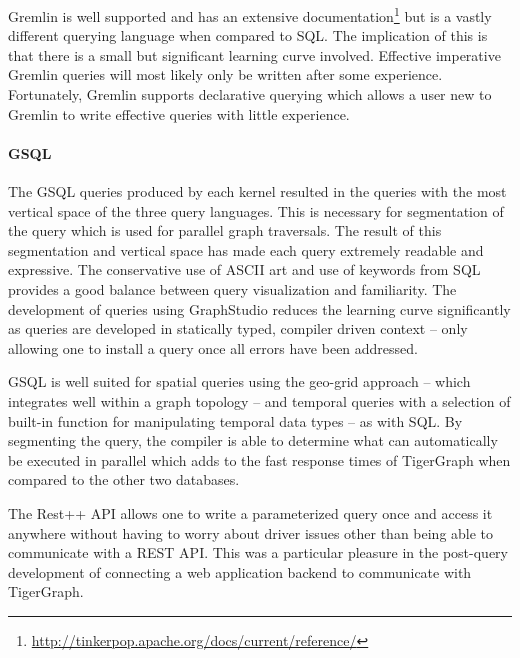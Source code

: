 Gremlin is well supported and has an extensive documentation\footnote{\url{http://tinkerpop.apache.org/docs/current/reference/}} but is a vastly different querying language when compared to SQL. The implication of this is that there is a small but significant learning curve involved. Effective imperative Gremlin queries will most likely only be written after some experience. Fortunately, Gremlin supports declarative querying which allows a user new to Gremlin to write effective queries with little experience.

\paragraph{GSQL} 

The GSQL queries produced by each kernel resulted in the queries with the most vertical space of the three query languages. This is necessary for segmentation of the query which is used for parallel graph traversals. The result of this segmentation and vertical space has made each query extremely readable and expressive. The conservative use of ASCII art and use of keywords from SQL provides a good balance between query visualization and familiarity. The development of queries using GraphStudio reduces the learning curve significantly as queries are developed in statically typed, compiler driven context -- only allowing one to install a query once all errors have been addressed. 

GSQL is well suited for spatial queries using the geo-grid approach -- which integrates well within a graph topology -- and temporal queries with a selection of built-in function for manipulating temporal data types -- as with SQL. By segmenting the query, the compiler is able to determine what can automatically be executed in parallel which adds to the fast response times of TigerGraph when compared to the other two databases.

The Rest++ API allows one to write a parameterized query once and access it anywhere without having to worry about driver issues other than being able to communicate with a REST API. This was a particular pleasure in the post-query development of connecting a web application backend to communicate with TigerGraph.
